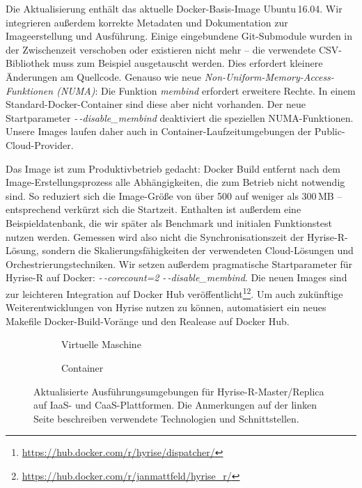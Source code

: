 Die Aktualisierung enthält das aktuelle Docker-Basis-Image Ubuntu\,16.04. Wir integrieren außerdem korrekte Metadaten und Dokumentation zur Imageerstellung und Ausführung. Einige eingebundene Git-Submodule wurden in der Zwischenzeit verschoben oder existieren nicht mehr -- die verwendete CSV-Bibliothek muss zum Beispiel ausgetauscht werden. Dies erfordert kleinere Änderungen am Quellcode. Genauso wie neue \emph{Non-Uniform-Memory-Access-Funktionen (NUMA)}: Die Funktion \emph{membind} erfordert erweitere Rechte. In einem Standard-Docker-Container sind diese aber nicht vorhanden. Der neue Startparameter \mbox{\emph{-\,-disable\_membind}} deaktiviert die speziellen NUMA-Funktionen. Unsere Images laufen daher auch in Container-Laufzeitumgebungen der Public-Cloud-Provider.

Das Image ist zum Produktivbetrieb gedacht: Docker Build entfernt nach dem Image-Erstellungsprozess alle Abhängigkeiten, die zum Betrieb nicht notwendig sind. So reduziert sich die Image-Größe von über 500 auf weniger als 300\,MB -- entsprechend verkürzt sich die Startzeit. Enthalten ist außerdem eine Beispieldatenbank, die wir später als Benchmark und initialen Funktionstest nutzen werden. Gemessen wird also nicht die Synchronisationszeit der Hyrise-R-Lösung, sondern die Skalierungsfähigkeiten der verwendeten Cloud-Lösungen und Orchestrierungstechniken. Wir setzen außerdem pragmatische Startparameter für Hyrise-R auf Docker: \emph{-\,-corecount=2} \emph{-\,-disable\_membind}. Die neuen Images sind zur leichteren Integration auf Docker Hub veröffentlicht\footnote{\url{https://hub.docker.com/r/hyrise/dispatcher/}}\footnote{\url{https://hub.docker.com/r/janmattfeld/hyrise_r/}}. Um auch zukünftige Weiterentwicklungen von Hyrise nutzen zu können, automatisiert ein neues Makefile Docker-Build-Voränge und den Realease auf Docker Hub.

\begin{figure}[ht]
	\centering
	\begin{subfigure}[b]{0.45\textwidth}
		\def\svgwidth{\linewidth}
		{\scriptsize \textsf{
				}}
		\caption{Virtuelle Maschine}
		\label{fig:sub:hyrise-r-runtime-vm}
	\end{subfigure}\hfill%
	\begin{subfigure}[b]{0.45\textwidth}
		\def\svgwidth{\linewidth}
		{\scriptsize \textsf{
				}}
		\caption{Container}
		\label{fig:sub:hyrise-r-runtime-docker}
	\end{subfigure}	
	\caption{Aktualisierte Ausführungsumgebungen für Hyrise-R-Master/Replica auf IaaS- und CaaS-Plattformen. Die Anmerkungen auf der linken Seite beschreiben verwendete Technologien und Schnittstellen.}
	\label{fig:devstack}
\end{figure}

